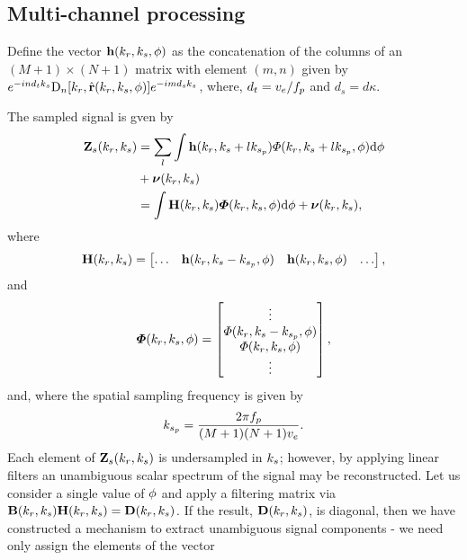 \documentclass[journal]{IEEEtran}
\newcommand{\prf}{\ensuremath{f_p}}
\newcommand{\phaseSep}{\ensuremath{d}}
\newcommand{\vecsigFreqSampled}{\ensuremath{\vct{Z}_s}}
\newcommand{\temporalbaseline}{\ensuremath{d_t}}
\newcommand{\spatialbaseline}{\ensuremath{d_s}}
\begin{document}
\subsection{Multi-channel processing}
Define the vector $\mathbf{h}(k_r, k_{s}, \phi)$ as the concatenation of the columns of an $(M+1)\times(N+1)$ matrix with element $(m,n)$ given by $\eex{-\im n\temporalbaseline\kparm}\dPattern{n}[\kr,\uRangeVector{\kveczero, \targetdepression}]\eex{-\im m\spatialbaseline\kparm}$, where, $\temporalbaseline=\effrelvel/\prf$ and $\spatialbaseline=\phaseSep\kappa$.
\par
The sampled signal is gven by
\begin{equation}
\begin{split}
\vecsigFreqSampled(\kr, \kparm) &= \sum_l\int\vct{h}(\kr, \kparm+l\kparmPRF)\vkern(\kr,\kparm+l\kparmPRF,\depression)\d\depression\\ 
&+ \boldsymbol{\nu}(\kr, \kparm)\\
&=\int\antennaMatrix(\kargs)\vkernvect(\kr, \kparm, \depression)\d\depression+ \boldsymbol{\nu}(\kr, \kparm),
\end{split}
\end{equation}
where
\begin{equation}
	\antennaMatrix(\kargs)=
    \begin{bmatrix}
    	\hdots & \vct{h}(\kr, \kparm - \kparmPRF, \depression) & \vct{h}(\kr, \kparm, \depression) & \hdots
    \end{bmatrix},
\end{equation}
and
\begin{equation}
	\boldsymbol{\varPhi}(k_r, k_{s}, \phi) = 
    \begin{bmatrix}
    	\vdots\\
        \varPhi(k_r,k_{s}-k_{s_p},\phi)\\
        \varPhi(k_r,k_{s},\phi)\\
        \vdots
    \end{bmatrix},
\end{equation}
and, where the spatial sampling frequency is given by
\begin{equation}
 \kparmPRF = \frac{2\pi\prf}{(M+1)(N+1)\effrelvel}.
\end{equation}
Each element of $\vecsigFreqSampled(\kr, \kparm)$ is undersampled in $k_{s}$; however, by applying linear filters an unambiguous scalar spectrum of the signal may be reconstructed. Let us consider a single value of $\phi$ and apply a filtering matrix via $\hrwsFilterMatrix(\kargs)\antennaMatrix(\kargs)=\diagAntennaMatrix(\kargs)$. If the result, $\diagAntennaMatrix(\kargs)$, is diagonal, then we have constructed a mechanism to extract unambiguous signal components - we need only assign the elements of the vector
\end{document}
